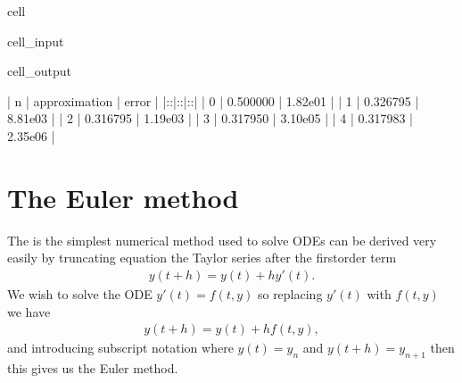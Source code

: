 \documentclass[letterpaper,10pt,english]{jupyterBook}
\begin{document}
\begin{sphinxuseclass}{cell}
\begin{sphinxVerbatimInput}
\begin{sphinxuseclass}{cell_input}
\end{sphinxuseclass}\end{sphinxVerbatimInput}
\begin{sphinxVerbatimOutput}

\begin{sphinxuseclass}{cell_output}
\begin{sphinxVerbatim}[commandchars=\\\{\}]
|  n  | approximation |  error   |
|:\PYGZhy{}\PYGZhy{}\PYGZhy{}:|:\PYGZhy{}\PYGZhy{}\PYGZhy{}\PYGZhy{}\PYGZhy{}\PYGZhy{}\PYGZhy{}\PYGZhy{}\PYGZhy{}\PYGZhy{}\PYGZhy{}\PYGZhy{}\PYGZhy{}:|:\PYGZhy{}\PYGZhy{}\PYGZhy{}\PYGZhy{}\PYGZhy{}\PYGZhy{}\PYGZhy{}\PYGZhy{}:|
|  0  |    0.500000   | 1.82e\PYGZhy{}01 |
|  1  |    0.326795   | 8.81e\PYGZhy{}03 |
|  2  |    0.316795   | 1.19e\PYGZhy{}03 |
|  3  |    0.317950   | 3.10e\PYGZhy{}05 |
|  4  |    0.317983   | 2.35e\PYGZhy{}06 |
\end{sphinxVerbatim}

\end{sphinxuseclass}\end{sphinxVerbatimOutput}

\end{sphinxuseclass}
\sphinxstepscope


\section{The Euler method}
\label{\detokenize{1_IVPs/1.2_Euler_Method:the-euler-method}}\label{\detokenize{1_IVPs/1.2_Euler_Method:euler-method-section}}\label{\detokenize{1_IVPs/1.2_Euler_Method::doc}}
\sphinxAtStartPar
The  is the simplest numerical method used to solve ODEs can be derived very easily by truncating equation the Taylor series after the first\sphinxhyphen{}order term
\begin{equation*}
\begin{split}y(t + h) = y(t) + h y'(t).\end{split}
\end{equation*}
\sphinxAtStartPar
We wish to solve the ODE \(y'(t) = f(t, y)\) so replacing \(y'(t)\) with \(f(t,y)\) we have
\begin{equation*}
\begin{split}y(t + h) = y(t) + h f(t, y),\end{split}
\end{equation*}
\sphinxAtStartPar
and introducing subscript notation where \(y(t) = y_n\) and \(y(t+h) = y_{n+1}\) then this gives us the Euler method.
\end{document}
